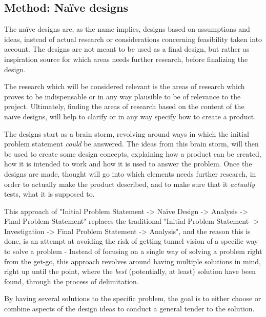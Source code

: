 
\subsection{Method: Naïve designs}
The naïve designs are, as the name implies, designs based on assumptions and ideas, instead of actual research or considerations concerning feasibility taken into account. The designs are not meant to be used as a final design, but rather as inspiration source for which areas needs further research, before finalizing the design.

The research which will be considered relevant is the areas of research which proves to be indispensable or in any way plausible to be of relevance to the project. Ultimately, finding the areas of research based on the content of the naïve designs, will help to clarify or in any way specify how to create a product.
\bigskip

The designs start as a brain storm, revolving around ways in which the initial problem statement \textit{could} be answered. The ideas from this brain storm, will then be used to create some design concepts, explaining how a product can be created, how it is intended to work and how it is used to answer the problem. Once the designs are made, thought will go into which elements needs further research, in order to actually make the product described, and to make sure that it \textit{actually} tests, what it is supposed to.
\bigskip

This approach of "Initial Problem Statement -> Naïve Design -> Analysis -> Final Problem Statement" replaces the traditional "Initial Problem Statement -> Investigation -> Final Problem Statement -> Analysis", and the reason this is done, is an attempt at avoiding the risk of getting tunnel vision of a specific way to solve a problem - Instead of focusing on a single way of solving a problem right from the get-go, this approach revolves around having multiple solutions in mind, right up until the point, where the \textit{best} (potentially, at least) solution have been found, through the process of delimitation. 

By having several solutions to the specific problem, the goal is to either choose or combine aspects of the design ideas to conduct a general tender to the solution.

